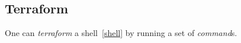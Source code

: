 \subsection{Terraform}
\label{terraform}

One can \emph{terraform} a shell~\ref{shell} by running a set of \emph{command}s.  